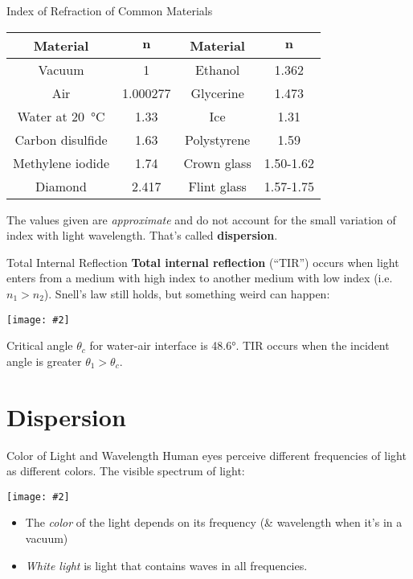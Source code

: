 \documentclass[compress,aspectratio=169]{beamer}
\newcommand{\pic}[2]{\texttt{[image: \#2]}}
\begin{document}
\begin{frame}{Index of Refraction of Common Materials}
  \begin{center}
    \begin{tabular}{c|c||c|c}
      \rowcolor{pink}
      \textbf{Material} & $\bm{n}$ & \textbf{Material} & $\bm{n}$\\ \hline
      Vacuum           & 1        & Ethanol     & 1.362 \\
      Air              & 1.000277 & Glycerine   & 1.473 \\
      Water at \SI{20}{\celsius} & 1.33 & Ice         & 1.31 \\
      Carbon disulfide & 1.63     & Polystyrene & 1.59 \\
      Methylene iodide & 1.74     & Crown glass & 1.50-1.62\\
      Diamond          & 2.417    & Flint glass & 1.57-1.75\\
    \end{tabular}
  \end{center}
  The values given are \emph{approximate} and do not account for the small
  variation of index with light wavelength. That's called \textbf{dispersion}.
\end{frame}



\begin{frame}{Total Internal Reflection}
  \textbf{Total internal reflection} (``TIR'') occurs when light enters from a
  medium with high index to another medium with low index (i.e.\ $n_1>n_2$).
  Snell's law still holds, but something weird can happen:
  \begin{center}
    \pic{.6}{graphics/660px-RefractionReflextion.png}
  \end{center}
  Critical angle $\theta_c$ for water-air interface is \ang{48.6}. TIR occurs
  when the incident angle is greater $\theta_1>\theta_c$.
\end{frame}



\section{Dispersion}

\begin{frame}{Color of Light and Wavelength}
  Human eyes perceive different frequencies of light as different colors. The
  visible spectrum of light:
  \begin{center}
    \pic{.4}{graphics/visiblespectrum.png}
  \end{center}
  \begin{itemize}
  \item The \emph{color} of the light depends on its frequency (\& wavelength
    when it's in a vacuum)
  \item \emph{White light} is light that contains waves in all frequencies.
  \end{itemize}
\end{frame}
\end{document}
